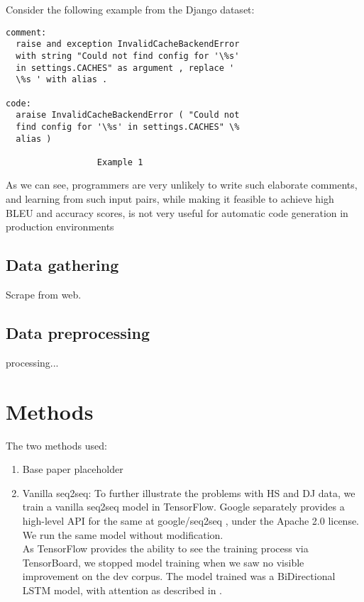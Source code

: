 \documentclass{IEEEtran}
\begin{document}
      \hspace*{-4mm}Consider the following example from the Django dataset:
      \begin{lstlisting}[frame=single,basicstyle=\small]
comment:
  raise and exception InvalidCacheBackendError 
  with string "Could not find config for '\%s' 
  in settings.CACHES" as argument , replace ' 
  \%s ' with alias .

code:
  araise InvalidCacheBackendError ( "Could not 
  find config for '\%s' in settings.CACHES" \% 
  alias )

                  Example 1
      \end{lstlisting}

      As we can see, programmers are very unlikely to write such elaborate comments, 
      and learning from such input pairs, while making it feasible to achieve high 
      BLEU and accuracy scores, is not very useful for automatic code generation  
      in production environments



      \subsection{Data gathering} Scrape from web.

      \subsection{Data preprocessing} processing...

    \section{Methods}

    The two methods used:

    \begin{enumerate}
        \item Base paper placeholder
        \item Vanilla seq2seq: To further illustrate the problems with HS and DJ data, we train a 
          vanilla seq2seq model in TensorFlow. Google separately provides a high-level API for 
          the same at google/seq2seq \cite{britz2017}, under the Apache 2.0 license. 
          We run the same model without modification. \\
          As TensorFlow provides the ability to see the training process via TensorBoard, we
          stopped model training when we saw no visible improvement on the dev corpus. The model
          trained was a BiDirectional LSTM model, with attention as described in 
          \cite{bahdanau2014neural}.
    \end{enumerate}
\end{document}

